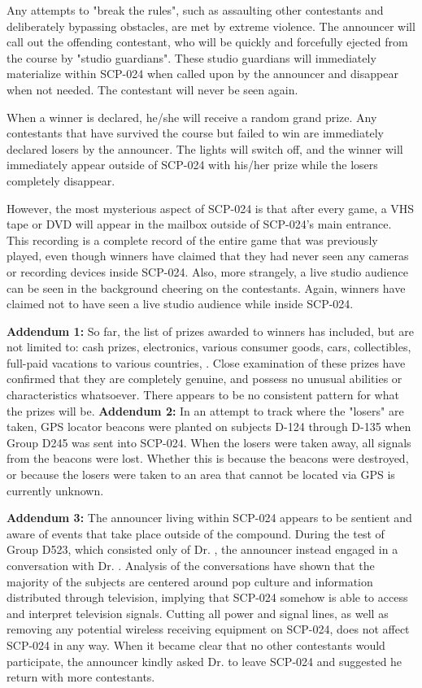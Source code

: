 Any attempts to "break the rules", such as assaulting other contestants and deliberately bypassing obstacles, are met by extreme violence. The announcer will call out the offending contestant, who will be quickly and forcefully ejected from the course by "studio guardians". These studio guardians will immediately materialize within SCP-024 when called upon by the announcer and disappear when not needed. The contestant will never be seen again.

When a winner is declared, he/she will receive a random grand prize. Any contestants that have survived the course but failed to win are immediately declared losers by the announcer. The lights will switch off, and the winner will immediately appear outside of SCP-024 with his/her prize while the losers completely disappear.

However, the most mysterious aspect of SCP-024 is that after every game, a VHS tape or DVD will appear in the mailbox outside of SCP-024's main entrance. This recording is a complete record of the entire game that was previously played, even though winners have claimed that they had never seen any cameras or recording devices inside SCP-024. Also, more strangely, a live studio audience can be seen in the background cheering on the contestants. Again, winners have claimed not to have seen a live studio audience while inside SCP-024.

\textbf{Addendum 1:} So far, the list of prizes awarded to winners has included, but are not limited to: cash prizes, electronics, various consumer goods, cars, collectibles, full-paid vacations to various countries, \expunged. Close examination of these prizes have confirmed that they are completely genuine, and possess no unusual abilities or characteristics whatsoever. There appears to be no consistent pattern for what the prizes will be.
\newpage
\textbf{Addendum 2:} In an attempt to track where the "losers" are taken, GPS locator beacons were planted on subjects D-124 through D-135 when Group D245 was sent into SCP-024. When the losers were taken away, all signals from the beacons were lost. Whether this is because the beacons were destroyed, or because the losers were taken to an area that cannot be located via GPS is currently unknown.

\textbf{Addendum 3:} The announcer living within SCP-024 appears to be sentient and aware of events that take place outside of the compound. During the test of Group D523, which consisted only of Dr. , the announcer instead engaged in a conversation with Dr. . Analysis of the conversations have shown that the majority of the subjects are centered around pop culture and information distributed through television, implying that SCP-024 somehow is able to access and interpret television signals. Cutting all power and signal lines, as well as removing any potential wireless receiving equipment on SCP-024, does not affect SCP-024 in any way. When it became clear that no other contestants would participate, the announcer kindly asked Dr.  to leave SCP-024 and suggested he return with more contestants.

